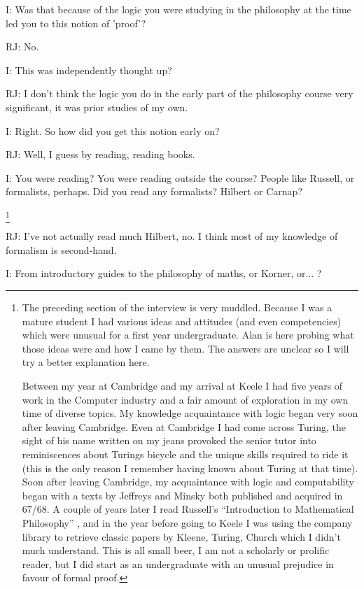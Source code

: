 \documentclass[10pt,titlepage]{book}
\begin{document}
I: Was that because of the logic you were studying in the philosophy at the time led you to this notion of 'proof'?

RJ: No.

I: This was independently thought up?

RJ: I don't think the logic you do in the early part of the philosophy course very significant, it was prior studies of my own.

I: Right. So how did you get this notion early on?

RJ: Well, I guess by reading, reading books.

I: You were reading? You were reading outside the course? People like Russell, or formalists, perhaps. Did you read any formalists? Hilbert or Carnap?

\footnote{
The preceding section of the interview is very muddled.
Because I was a mature student I had various ideas and attitudes (and even competencies) which were unusual for a first year undergraduate.
Alan is here probing what those ideas were and how I came by them.
The answers are unclear so I will try a better explanation here.

Between my year at Cambridge and my arrival at Keele I had five years of work in the Computer industry and a fair amount of exploration in my own time of diverse topics.
My knowledge acquaintance with logic began very soon after leaving Cambridge.
Even at Cambridge I had come across Turing, the sight of his name written on my jeans provoked the senior tutor into reminiscences about Turings bicycle and the unique skills required to ride it (this is the only reason I remember having known about Turing at that time).
Soon after leaving Cambridge, my acquaintance with logic and computability began with a texts by Jeffreys \cite{jeffreys1967} and Minsky \cite{minsky1967} both published and acquired in 67/68.
A couple of years later I read Russell's ``Introduction to Mathematical Philosophy'' \cite{russell1919}, and in the year before going to Keele I was using the company library to retrieve classic papers by Kleene, Turing, Church which I didn't much understand.
This is all small beer, I am not a scholarly or prolific reader, but I did start as an undergraduate with an unusual prejudice in favour of formal proof.
}


RJ: I've not actually read much Hilbert, no. I think most of my knowledge of formalism is second-hand.

I: From introductory guides to the philosophy of maths, or Korner, or... ?
\end{document}
